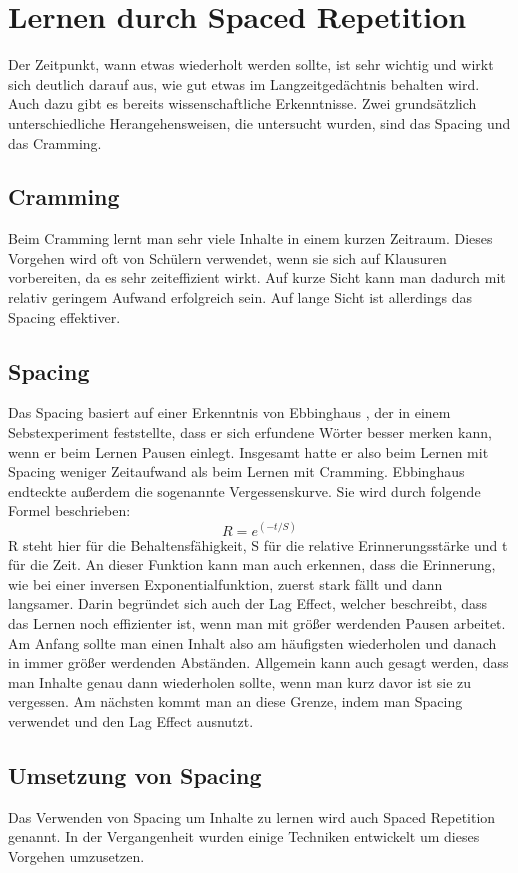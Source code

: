 \section{Lernen durch Spaced Repetition}
Der Zeitpunkt, wann etwas wiederholt werden sollte, ist sehr wichtig und wirkt sich deutlich darauf aus, wie gut etwas im Langzeitgedächtnis behalten wird. Auch dazu gibt es bereits wissenschaftliche Erkenntnisse.
Zwei grundsätzlich unterschiedliche Herangehensweisen, die untersucht wurden, sind das Spacing und das Cramming.

\subsection{Cramming}
Beim Cramming lernt man sehr viele Inhalte in einem kurzen Zeitraum. Dieses Vorgehen wird oft von Schülern verwendet, wenn sie sich auf Klausuren vorbereiten, da es sehr zeiteffizient wirkt. Auf kurze Sicht kann man dadurch mit relativ geringem Aufwand erfolgreich sein. Auf lange Sicht ist allerdings das Spacing effektiver.
\cite{schimanke_spaced_2017}

\subsection{Spacing}
\label{cp:Spacing}
Das Spacing basiert auf einer Erkenntnis von Ebbinghaus \cite{hermann_ebbinghaus_uber_1885}, der in einem Sebstexperiment feststellte, dass er sich erfundene Wörter besser merken kann, wenn er beim Lernen Pausen einlegt. Insgesamt hatte er also beim Lernen mit Spacing weniger Zeitaufwand als beim Lernen mit Cramming. Ebbinghaus endteckte außerdem die sogenannte Vergessenskurve.
Sie wird durch folgende Formel beschrieben:
$$R = e^{(-t/S)}$$
R steht hier für die Behaltensfähigkeit, S für die relative Erinnerungsstärke und t für die Zeit.
An dieser Funktion kann man auch erkennen, dass die Erinnerung, wie bei einer inversen Exponentialfunktion, zuerst stark fällt und dann langsamer. Darin begründet sich auch der Lag Effect, welcher beschreibt, dass das Lernen noch effizienter ist, wenn man mit größer werdenden Pausen arbeitet. Am Anfang sollte man einen Inhalt also am häufigsten wiederholen und danach in immer größer werdenden Abständen. Allgemein kann auch gesagt werden, dass man Inhalte genau dann wiederholen sollte, wenn man kurz davor ist sie zu vergessen. Am nächsten kommt man an diese Grenze, indem man Spacing verwendet und den Lag Effect ausnutzt.
\cite{schimanke_spaced_2017}

\subsection{Umsetzung von Spacing}
\label{cp:halbwertszeitregression}
Das Verwenden von Spacing um Inhalte zu lernen wird auch Spaced Repetition genannt. In der Vergangenheit wurden einige Techniken entwickelt um dieses Vorgehen umzusetzen.

